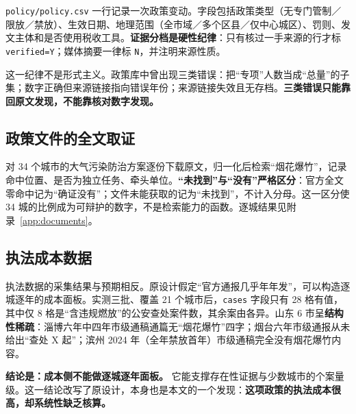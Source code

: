 \texttt{policy/policy.csv} 一行记录一次政策变动。字段包括政策类型（无专门管制／限放／禁放）、生效日期、地理范围（全市域／多个区县／仅中心城区）、罚则、发文主体和是否使用税收工具。\textbf{证据分档是硬性纪律}：只有核过一手来源的行才标 \texttt{verified=Y}；媒体摘要一律标 \texttt{N}，并注明来源性质。

这一纪律不是形式主义。政策库中曾出现三类错误：把“专项”人数当成“总量”的子集；数字正确但来源链接指向错误年份；来源链接失效且无存档。\textbf{三类错误只能靠回原文发现，不能靠核对数字发现。}

\subsection{政策文件的全文取证}\label{sec:fulltext}

对 34 个城市的大气污染防治方案逐份下载原文，归一化后检索“烟花爆竹”，记录命中位置、是否为独立任务、牵头单位。\textbf{“未找到”与“没有”严格区分}：官方全文零命中记为“确证没有”；文件未能获取的记为“未找到”，不计入分母。这一区分使 34 城的比例成为可辩护的数字，不是检索能力的函数。逐城结果见附录~\ref{app:documents}。

\subsection{执法成本数据}

执法数据的采集结果与预期相反。原设计假定“官方通报几乎年年发”，可以构造逐城逐年的成本面板。实测三批、覆盖 21 个城市后，\texttt{cases} 字段只有 28 格有值，其中仅 8 格是“含违规燃放”的公安查处案件数，其余案由各异。山东 6 市呈\textbf{结构性稀疏}：淄博六年中四年市级通稿通篇无“烟花爆竹”四字；烟台六年市级通报从未给出“查处 X 起”；滨州 2024 年（全年禁放首年）市级通稿完全没有烟花爆竹内容。

\textbf{结论是：成本侧不能做逐城逐年面板。} 它能支撑存在性证据与少数城市的个案量级。这一结论改写了原设计，本身也是本文的一个发现：\textbf{这项政策的执法成本很高，却系统性缺乏核算。}
